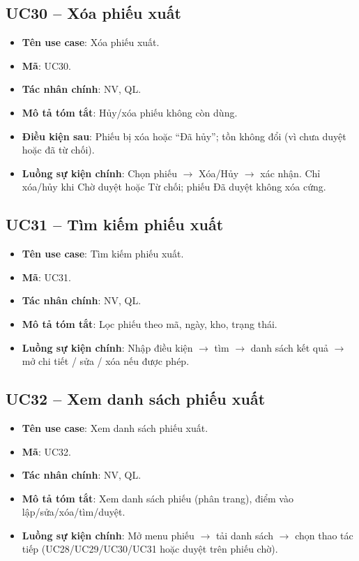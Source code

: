\subsection{UC30 -- Xóa phiếu xuất}

\begin{itemize}[leftmargin=1.5cm]
    \item \textbf{Tên use case}: Xóa phiếu xuất.
    \item \textbf{Mã}: UC30.
    \item \textbf{Tác nhân chính}: NV, QL.
    \item \textbf{Mô tả tóm tắt}: Hủy/xóa phiếu không còn dùng.
    \item \textbf{Điều kiện sau}: Phiếu bị xóa hoặc ``Đã hủy''; tồn không đổi (vì chưa duyệt hoặc đã từ chối).
    \item \textbf{Luồng sự kiện chính}: Chọn phiếu $\rightarrow$ Xóa/Hủy $\rightarrow$ xác nhận. Chỉ xóa/hủy khi Chờ duyệt hoặc Từ chối; phiếu Đã duyệt không xóa cứng.
\end{itemize}

\subsection{UC31 -- Tìm kiếm phiếu xuất}

\begin{itemize}[leftmargin=1.5cm]
    \item \textbf{Tên use case}: Tìm kiếm phiếu xuất.
    \item \textbf{Mã}: UC31.
    \item \textbf{Tác nhân chính}: NV, QL.
    \item \textbf{Mô tả tóm tắt}: Lọc phiếu theo mã, ngày, kho, trạng thái.
    \item \textbf{Luồng sự kiện chính}: Nhập điều kiện $\rightarrow$ tìm $\rightarrow$ danh sách kết quả $\rightarrow$ mở chi tiết / sửa / xóa nếu được phép.
\end{itemize}

\subsection{UC32 -- Xem danh sách phiếu xuất}

\begin{itemize}[leftmargin=1.5cm]
    \item \textbf{Tên use case}: Xem danh sách phiếu xuất.
    \item \textbf{Mã}: UC32.
    \item \textbf{Tác nhân chính}: NV, QL.
    \item \textbf{Mô tả tóm tắt}: Xem danh sách phiếu (phân trang), điểm vào lập/sửa/xóa/tìm/duyệt.
    \item \textbf{Luồng sự kiện chính}: Mở menu phiếu $\rightarrow$ tải danh sách $\rightarrow$ chọn thao tác tiếp (UC28/UC29/UC30/UC31 hoặc duyệt trên phiếu chờ).
\end{itemize}


